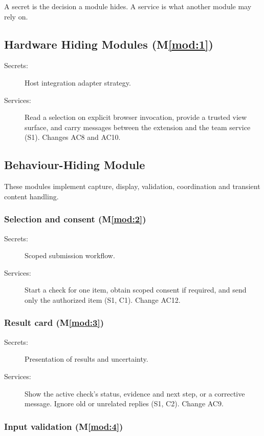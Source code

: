 \documentclass[12pt, titlepage]{article}
\newcommand{\mref}[1]{M\ref{#1}}
\newcommand{\modref}[1]{\mref{mod:#1}}
\begin{document}
A secret is the decision a module hides. A service is what another module may rely on.

\subsection{Hardware Hiding Modules (\modref{1})}

\begin{description}
\item[Secrets:] Host integration adapter strategy.
\item[Services:] Read a selection on explicit browser invocation, provide a trusted view surface, and carry messages between the extension and the team service (S1). Changes AC8 and AC10.
\end{description}

\subsection{Behaviour-Hiding Module}

These modules implement capture, display, validation, coordination and transient content handling.

\subsubsection{Selection and consent (\modref{2})}

\begin{description}
\item[Secrets:] Scoped submission workflow.
\item[Services:] Start a check for one item, obtain scoped consent if required, and send only the authorized item (S1, C1). Change AC12.
\end{description}

\subsubsection{Result card (\modref{3})}

\begin{description}
\item[Secrets:] Presentation of results and uncertainty.
\item[Services:] Show the active check's status, evidence and next step, or a corrective message. Ignore old or unrelated replies (S1, C2). Change AC9.
\end{description}

\subsubsection{Input validation (\modref{4})}
\end{document}
